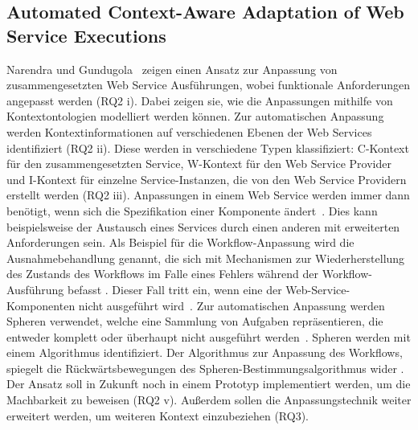 \documentclass[conference,compsoc]{IEEEtran}
\begin{document}
\subsection{Automated Context-Aware Adaptation of Web Service Executions}
Narendra und Gundugola~\cite{narendra2006automated} zeigen einen Ansatz zur Anpassung von zusammengesetzten Web Service Ausführungen, wobei funktionale Anforderungen angepasst werden (RQ2 i). Dabei zeigen sie, wie die Anpassungen mithilfe von Kontextontologien modelliert werden können. Zur automatischen Anpassung werden Kontextinformationen auf verschiedenen Ebenen der Web Services identifiziert (RQ2 ii). Diese werden in verschiedene Typen klassifiziert: C-Kontext für den zusammengesetzten Service, W-Kontext für den Web Service Provider und I-Kontext für einzelne Service-Instanzen, die von den Web Service Providern erstellt werden (RQ2 iii)\cite{narendra2006automated}. Anpassungen in einem Web Service werden immer dann benötigt, wenn sich die Spezifikation einer Komponente ändert~\cite{narendra2006automated}. Dies kann beispielsweise der Austausch eines Services durch einen anderen mit erweiterten Anforderungen sein.
Als Beispiel für die Workflow-Anpassung wird die Ausnahmebehandlung genannt, die sich mit Mechanismen zur Wiederherstellung des Zustands des Workflows im Falle eines Fehlers während der Workflow-Ausführung befasst \cite{narendra2006automated}. Dieser Fall tritt ein, wenn eine der Web-Service-Komponenten nicht ausgeführt wird~\cite{narendra2006automated}.
Zur automatischen Anpassung werden Spheren verwendet, welche eine Sammlung von Aufgaben repräsentieren, die entweder komplett oder überhaupt nicht ausgeführt werden~\cite{narendra2006automated}. Spheren werden mit einem Algorithmus identifiziert. Der Algorithmus zur Anpassung des Workflows, spiegelt die Rückwärtsbewegungen des Spheren-Bestimmungsalgorithmus wider \cite{narendra2006automated}.
Der Ansatz soll in Zukunft noch in einem Prototyp implementiert werden, um die Machbarkeit zu beweisen (RQ2 v). Außerdem sollen die Anpassungstechnik weiter erweitert werden, um weiteren Kontext einzubeziehen (RQ3).
\end{document}
